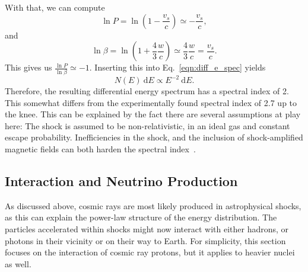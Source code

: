 With that, we can compute
\begin{equation}
    \ln P = \ln ( 1-\frac{v_s}{c}) \simeq -\frac{v_s}{c},
\end{equation}
and
\begin{equation}
    \ln \beta = \ln(1+\frac{4}{3}\frac{w}{c}) \simeq \frac{4}{3}\frac{w}{c} = \frac{v_s}{c}.
\end{equation}
This gives us $\frac{\ln P}{\ln \beta} \simeq -1$. Inserting this into Eq.~\ref{eqn:diff_e_spec} yields
\begin{equation}
    N(E)~\text{d} E \propto E^{-2}~\text{d} E.
\end{equation}
Therefore, the resulting differential energy spectrum has a spectral index of 2. This somewhat differs from the experimentally found spectral index of 2.7 up to the knee. This can be explained by the fact there are several assumptions at play here: The shock is assumed to be non-relativistic, in an ideal gas and constant escape probability. Inefficiencies in the shock, and the inclusion of shock-amplified magnetic fields can both harden the spectral index~\cite{Spurio2018}.

\subsection{Interaction and Neutrino Production}\label{cr_interactions}
As discussed above, cosmic rays are most likely produced in astrophysical shocks, as this can explain the power-law structure of the energy distribution. The particles accelerated within shocks might now interact with either hadrons, or photons in their vicinity or on their way to Earth. For simplicity, this section focuses on the interaction of cosmic ray protons, but it applies to heavier nuclei as well.

